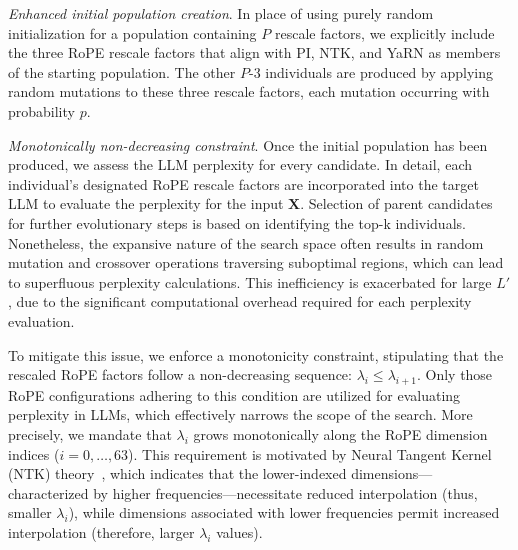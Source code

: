 \textit{Enhanced initial population creation}. In place of using purely random initialization for a population containing $P$ rescale factors, we explicitly include the three RoPE rescale factors that align with PI, NTK, and YaRN as members of the starting population. The other $P$-3 individuals are produced by applying random mutations to these three rescale factors, each mutation occurring with probability $p$.

\textit{Monotonically non-decreasing constraint}. Once the initial population has been produced, we assess the LLM perplexity for every candidate. In detail, each individual’s designated RoPE rescale factors are incorporated into the target LLM to evaluate the perplexity for the input $\mathbf{X}$. Selection of parent candidates for further evolutionary steps is based on identifying the top-k individuals. Nonetheless, the expansive nature of the search space often results in random mutation and crossover operations traversing suboptimal regions, which can lead to superfluous perplexity calculations. This inefficiency is exacerbated for large $L'$, due to the significant computational overhead required for each perplexity evaluation.

To mitigate this issue, we enforce a monotonicity constraint, stipulating that the rescaled RoPE factors follow a non-decreasing sequence: $\lambda_i \leq \lambda_{i+1}$. Only those RoPE configurations adhering to this condition are utilized for evaluating perplexity in LLMs, which effectively narrows the scope of the search. More precisely, we mandate that $\lambda_i$ grows monotonically along the RoPE dimension indices ($i = 0, \ldots, 63$). This requirement is motivated by Neural Tangent Kernel (NTK) theory~\cite{jacot2018neural,tancik2020fourier,ntk}, which indicates that the lower-indexed dimensions—characterized by higher frequencies—necessitate reduced interpolation (thus, smaller $\lambda_i$), while dimensions associated with lower frequencies permit increased interpolation (therefore, larger $\lambda_i$ values).

